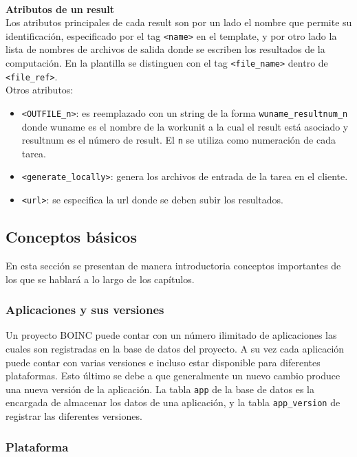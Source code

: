 \textbf{\\Atributos de un result}\\

Los atributos principales de cada result son por un lado el nombre que permite su identificación, especificado por el tag \texttt{<name>} en el template, y por otro lado la lista de nombres de archivos de salida donde se escriben los resultados de la computación. En la plantilla se distinguen con el tag \texttt{<file\_name>} dentro de \texttt{<file\_ref>}.\\

Otros atributos:

\begin{itemize}
\item \texttt{<OUTFILE\_n>}: es reemplazado con un string de la forma \texttt{wuname\_resultnum\_n} donde wuname es el nombre de la workunit a la cual el result está asociado y resultnum es el número de result. El \texttt{n} se utiliza como numeración de cada tarea.
\item \texttt{<generate\_locally>}:  genera los archivos de entrada de la tarea en el cliente.
\item \texttt{<url>}: se especifica la url donde se deben subir los resultados.
\end{itemize}

\subsection{Conceptos básicos}

En esta sección se presentan de manera introductoria conceptos importantes de los que se hablará a lo largo de los capítulos.

\subsubsection{Aplicaciones y sus versiones}

Un proyecto BOINC puede contar con un número ilimitado de aplicaciones las cuales son registradas en la base de datos del proyecto. A su vez cada aplicación puede contar con varias versiones e incluso estar disponible para diferentes plataformas. Esto último se debe a que generalmente un nuevo cambio produce una nueva versión de la aplicación.
La tabla \texttt{app} de la base de datos es la encargada de almacenar los datos de una aplicación, y la tabla \texttt{app\_version} de registrar las diferentes versiones.

\subsubsection{Plataforma}

